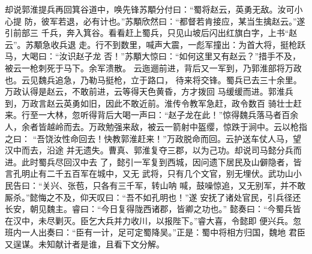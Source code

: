 却说郭淮提兵再回箕谷道中，唤先锋苏顒分付曰：“蜀将赵云，英勇无敌。汝可小心提
防，彼军若退，必有计也。”苏顒欣然曰：“都督若肯接应，某当生擒赵云。”遂引前部三
千兵，奔入箕谷。看看赶上蜀兵，只见山坡后闪出红旗白字，上书“赵云”。苏顒急收兵退
走。行不到数里，喊声大震，一彪军撞出：为首大将，挺枪跃马，大喝曰：“汝识赵子龙
否！”苏顒大惊曰：“如何这里又有赵云？”措手不及，被云一枪刺死于马下。余军溃散。
云迤逦前进，背后又一军到，乃郭淮部将万政也。云见魏兵追急，乃勒马挺枪，立于路口，
待来将交锋。蜀兵已去三十余里。万政认得是赵云，不敢前进，云等得天色黄昏，方才拨回
马缓缓而进。郭淮兵到，万政言赵云英勇如旧，因此不敢近前。淮传令教军急赶，政令数百
骑壮士赶来。行至一大林，忽听得背后大喝一声曰：“赵子龙在此！”惊得魏兵落马者百余
人，余者皆越岭而去。万政勉强来敌，被云一箭射中盔缨，惊跌于涧中。云以枪指之曰：
“吾饶汝性命回去！快教郭淮赶来！”万政脱命而回。云护送车仗人马，望汉中而去，沿途
并无遗失。曹真、郭淮复夺三郡，以为己功。却说司马懿分兵而进。此时蜀兵尽回汉中去
了，懿引一军复到西城，因问遗下居民及山僻隐者，皆言孔明止有二千五百军在城中，又无
武将，只有几个文官，别无埋伏。武功山小民告曰：“关兴、张苞，只各有三千军，转山呐
喊，鼓噪惊追，又无别军，并不敢厮杀。”懿悔之不及，仰天叹曰：“吾不如孔明也！”遂
安抚了诸处官民，引兵径还长安，朝见魏主。睿曰：“今日复得陇西诸郡，皆卿之功也。”
懿奏曰：“今蜀兵皆在汉中，未尽剿灭。臣乞大兵并力收川，以报陛下。”睿大喜，令懿即
便兴兵。忽班内一人出奏曰：“臣有一计，足可定蜀降吴。”正是：蜀中将相方归国，魏地
君臣又逞谋。未知献计者是谁，且看下文分解。